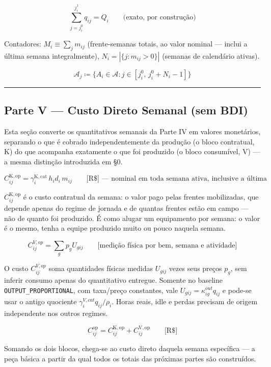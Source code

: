 \documentclass[
  10pt,
]{article}
\begin{document}
\[\sum_{j=j_i^0}^{j_i^1} q_{ij} = Q_i \qquad\text{(exato, por construção)}\]

Contadores: \(M_i \equiv \sum_j m_{ij}\) (frente-semanas totais, ao
valor nominal --- inclui a última semana integralmente),
\(N_i = |\{j:m_{ij}>0\}|\) (semanas de calendário ativas).

\[\mathcal{A}_j \coloneqq \{A_i\in\mathcal{A} : j\in[j_i^0,\,j_i^0+N_i-1]\}\]

\begin{center}\rule{0.5\linewidth}{0.5pt}\end{center}

\hypertarget{parte-v-custo-direto-semanal-sem-bdi}{%
\subsection{Parte V --- Custo Direto Semanal (sem
BDI)}\label{parte-v-custo-direto-semanal-sem-bdi}}

Esta seção converte os quantitativos semanais da Parte IV em valores
monetários, separando o que é cobrado independentemente da produção (o
bloco contratual, K) do que acompanha exatamente o que foi produzido (o
bloco consumível, V) --- a mesma distinção introduzida em §0.

\[C_{ij}^{\mathrm{K,op}} = \gamma_i^{\mathrm{K,cat}}\,h_id_i\,m_{ij}\qquad\text{[R\$] — nominal em toda semana ativa, inclusive a última}\]

\(C_{ij}^{\mathrm{K,op}}\) é o custo contratual da semana: o valor pago
pelas frentes mobilizadas, que depende apenas do regime de jornada e de
quantas frentes estão em campo --- não de quanto foi produzido. É como
alugar um equipamento por semana: o valor é o mesmo, tenha a equipe
produzido muito ou pouco naquela semana.

\[C_{ij}^{V,op}=\sum_g p_g U_{gij}\qquad\text{[medição física por bem, semana e atividade]}\]

O custo \(C_{ij}^{V,op}\) soma quantidades físicas medidas \(U_{gij}\) vezes seus preços \(p_g\), sem inferir consumo apenas do quantitativo entregue. Somente no baseline \texttt{OUTPUT\_PROPORTIONAL}, com taxa/preço constantes, vale \(U_{gij}=\kappa^{out}_{ig}q_{ij}\) e pode-se usar o antigo quociente \(\gamma_i^{V,cat}q_{ij}/\rho_i\). Horas reais, idle e perdas precisam de origem independente nos outros regimes.

\[C_{ij}^{\mathrm{op}} = C_{ij}^{\mathrm{K,op}}+C_{ij}^{\mathrm{V,op}}\qquad\text{[R\$]}\]

Somando os dois blocos, chega-se ao custo direto daquela semana
específica --- a peça básica a partir da qual todos os totais das
próximas partes são construídos.
\end{document}
